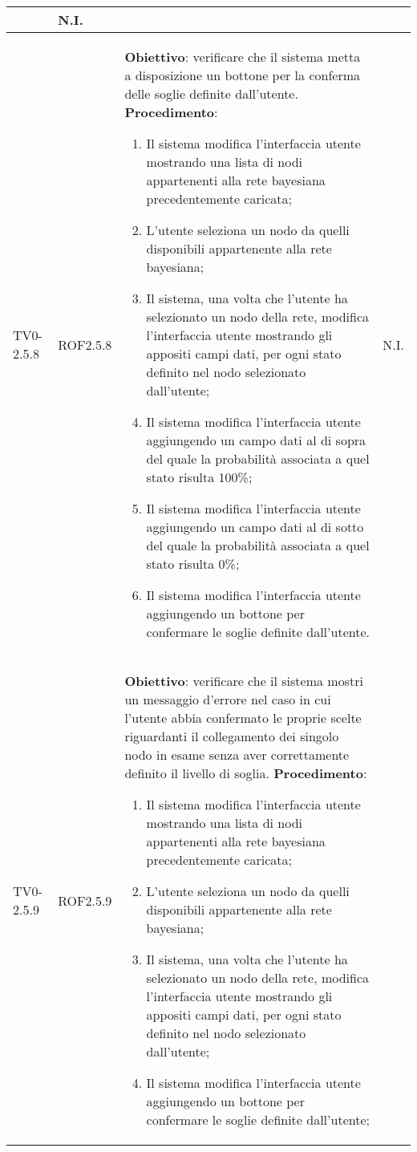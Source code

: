 \begin{longtable}{|m{}|m{}|m{}|m{}|}
\begin{enumerate}
	\end{enumerate}
	& N.I. \\
\hline
TV0-2.5.8 & ROF2.5.8 & 
	\textbf{Obiettivo}: verificare che il sistema metta a disposizione un bottone per la conferma delle soglie definite dall'utente. \newline
	\textbf{Procedimento}: 
	\begin{enumerate}
		\item Il sistema modifica l'interfaccia utente mostrando una lista di nodi appartenenti alla rete bayesiana precedentemente caricata; 
		\item L'utente seleziona un nodo da quelli disponibili appartenente alla rete bayesiana; 
		\item Il sistema, una volta che l'utente ha selezionato un nodo della rete, modifica l'interfaccia utente mostrando gli appositi campi dati, per ogni stato definito nel nodo selezionato dall'utente;
		\item Il sistema modifica l'interfaccia utente aggiungendo un campo dati al di sopra del quale la probabilità associata a quel stato risulta 100\%; 
		\item Il sistema modifica l'interfaccia utente aggiungendo un campo dati al di sotto del quale la probabilità associata a quel stato risulta 0\%; 
		\item Il sistema modifica l'interfaccia utente aggiungendo un bottone per confermare le soglie definite dall'utente. 
	\end{enumerate}
	& N.I. \\
\hline
\rowcolor{grigio} TV0-2.5.9 & ROF2.5.9 & 
	\textbf{Obiettivo}: verificare che il sistema mostri un messaggio d'errore nel caso in cui l'utente abbia confermato le proprie scelte riguardanti il collegamento dei singolo nodo in esame senza aver correttamente definito il livello di soglia. \newline
	\textbf{Procedimento}: 
	\begin{enumerate}
		\item Il sistema modifica l'interfaccia utente mostrando una lista di nodi appartenenti alla rete bayesiana precedentemente caricata; 
		\item L'utente seleziona un nodo da quelli disponibili appartenente alla rete bayesiana; 
		\item Il sistema, una volta che l'utente ha selezionato un nodo della rete, modifica l'interfaccia utente mostrando gli appositi campi dati, per ogni stato definito nel nodo selezionato dall'utente;
		\item Il sistema modifica l'interfaccia utente aggiungendo un bottone per confermare le soglie definite dall'utente; 

\end{enumerate}
\end{longtable}
